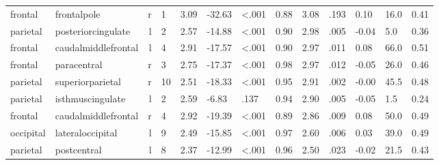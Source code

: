 \documentclass{article}
\begin{document}
\begin{longtable}{llrR{1.5cm}R{1cm}R{1.3cm}R{1cm}R{1cm}R{1.3cm}R{1cm}R{1.8cm}R{1.3cm}R{1.8cm}}
   frontal &               frontalpole &    r &            1 &                  3.09 &           -32.63 &      \textless.001 &                               0.88 &                          3.08 &                            .193 &  0.10 &   16.0 &      0.41 \\
  parietal &        posteriorcingulate &    l &            2 &                  2.57 &           -14.88 &      \textless.001 &                               0.90 &                          2.98 &                            .005 & -0.04 &    5.0 &      0.36 \\
   frontal &       caudalmiddlefrontal &    l &            4 &                  2.91 &           -17.57 &      \textless.001 &                               0.90 &                          2.97 &                            .011 &  0.08 &   66.0 &      0.51 \\
   frontal &               paracentral &    r &            3 &                  2.75 &           -17.37 &      \textless.001 &                               0.98 &                          2.97 &                            .012 & -0.05 &   26.0 &      0.46 \\
  parietal &          superiorparietal &    r &           10 &                  2.51 &           -18.33 &      \textless.001 &                               0.95 &                          2.91 &                            .002 & -0.00 &   45.5 &      0.48 \\
  parietal &          isthmuscingulate &    l &            2 &                  2.59 &            -6.83 &               .137 &                               0.94 &                          2.90 &                            .005 & -0.05 &    1.5 &      0.24 \\
   frontal &       caudalmiddlefrontal &    r &            4 &                  2.92 &           -19.39 &      \textless.001 &                               0.89 &                          2.86 &                            .009 &  0.08 &   50.0 &      0.49 \\
 occipital &          lateraloccipital &    l &            9 &                  2.49 &           -15.85 &      \textless.001 &                               0.97 &                          2.60 &                            .006 &  0.03 &   39.0 &      0.49 \\
  parietal &               postcentral &    l &            8 &                  2.37 &           -12.99 &      \textless.001 &                               0.96 &                          2.50 &                            .023 & -0.02 &   21.5 &      0.43 \\

\end{longtable}
\end{document}
